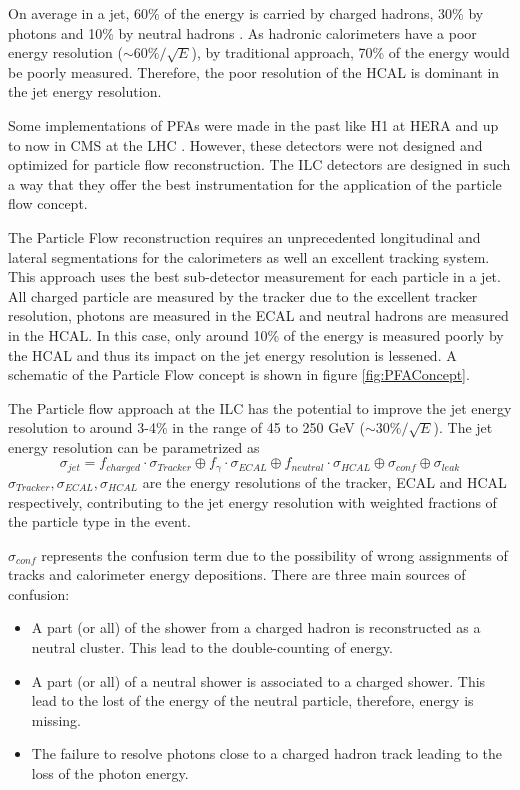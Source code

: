 On average in a jet, 60\% of the energy is carried by charged hadrons, 30\% by photons and 10\% by neutral hadrons \cite{Ebrahimi:394104}. As hadronic calorimeters have a poor energy resolution ($\sim 60\%/\sqrt{E}$), by traditional approach, 70\% of the energy would be poorly measured. Therefore, the poor resolution of the HCAL is dominant in the jet energy resolution.

Some implementations of PFAs were made in the past like H1 at HERA \cite{Abt:1994ye} and up to now in CMS at the LHC \cite{Sirunyan:2017ulk}. However, these detectors were not designed and optimized for particle flow reconstruction. The ILC detectors are designed in such a way that they offer the best instrumentation for the application of the particle flow concept.

The Particle Flow reconstruction requires an unprecedented longitudinal and lateral segmentations for the calorimeters as well an excellent tracking system. This approach uses the best sub-detector measurement for each particle in a jet. All charged particle are measured by the tracker due to the excellent tracker resolution, photons are measured in the ECAL and neutral hadrons are measured in the HCAL. In this case, only around 10\% of the energy is measured poorly by the HCAL and thus its impact on the jet energy resolution is lessened. A schematic of the Particle Flow concept is shown in figure \ref{fig:PFAConcept}.

The Particle flow approach at the ILC has the potential to improve the jet energy resolution to around 3-4\% in the range of 45 to 250 GeV ($\sim 30\%/\sqrt{E}$). The jet energy resolution can be parametrized as
\begin{equation}
  \sigma_{jet} = f_{charged} \cdot \sigma_{Tracker} \oplus f_{\gamma} \cdot \sigma_{ECAL} \oplus f_{neutral} \cdot \sigma_{HCAL} \oplus \sigma_{conf} \oplus \sigma_{leak}
\end{equation}
$\sigma_{Tracker}, \sigma_{ECAL}, \sigma_{HCAL}$ are the energy resolutions of the tracker, ECAL and HCAL respectively, contributing to the jet energy resolution with weighted fractions of the particle type in the event.

$\sigma_{conf}$ represents the confusion term due to the possibility of wrong assignments of tracks and calorimeter energy depositions. There are three main sources of confusion:

\begin{itemize}
  \item A part (or all) of the shower from a charged hadron is reconstructed as a neutral cluster. This lead to the double-counting of energy.
  \item A part (or all) of a neutral shower is associated to a charged shower. This lead to the lost of the energy of the neutral particle, therefore, energy is missing.
  \item The failure to resolve photons close to a charged hadron track leading to the loss of the photon energy.
\end{itemize}

